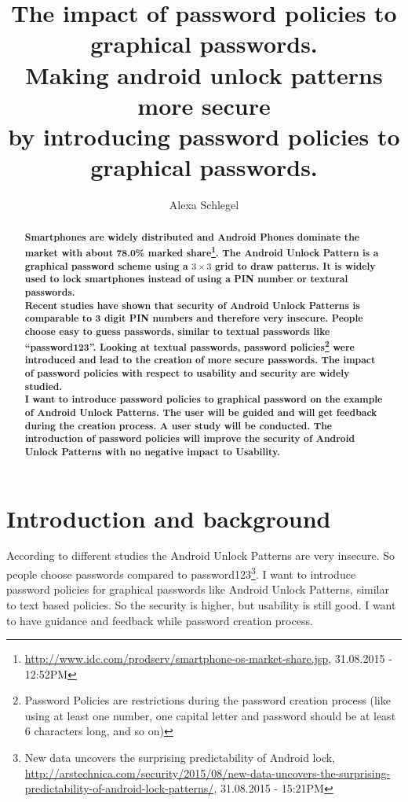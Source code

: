\documentclass[twocolumn, a4paper, 10pt]{article}
\begin{document}
\title{
  The impact of password policies to graphical passwords.\\
  \large Making android unlock patterns more secure \\
  by introducing password policies to graphical passwords.}

\author{
	Alexa Schlegel
}

\maketitle

\def\abstractname{{\textbf Abstract}}
\begin{abstract}
{
\bfseries
Smartphones are widely distributed and Android Phones dominate the market with about 78.0\% marked share\footnote{\url{http://www.idc.com/prodserv/smartphone-os-market-share.jsp}, 31.08.2015 - 12:52PM}. The Android Unlock Pattern is a graphical password scheme using a $3\times3$ grid to draw patterns. It is widely used to lock smartphones instead of using a PIN number or textural passwords.\\

Recent studies have shown that security of Android Unlock Patterns is comparable to 3 digit PIN numbers and therefore very insecure. People choose easy to guess passwords, similar to textual passwords like ``password123''. Looking at textual passwords, password policies\footnote{Password Policies are restrictions during the password creation process (like using at least one number, one capital letter and password should be at least 6 characters long, and so on)} were introduced and lead to the creation of more secure passwords. The impact of password policies with respect to usability and security are widely studied.\\

I want to introduce password policies to graphical password on the example of Android Unlock Patterns. The user will be guided and will get feedback during the creation process. A user study will be conducted. The introduction of password policies will improve the security of Android Unlock Patterns with no negative impact to Usability.
}
\end{abstract}


\section{Introduction and background}
According to different studies the Android Unlock Patterns are very insecure. So people choose passwords compared to password123\footnote{New data uncovers the surprising predictability of Android lock, \url{http://arstechnica.com/security/2015/08/new-data-uncovers-the-surprising-predictability-of-android-lock-patterns/}, 31.08.2015 - 15:21PM}. I want to introduce password policies for  graphical passwords like Android Unlock Patterns, similar to text based policies. So the security is higher, but usability is still good. I want to have guidance and feedback while password creation process.\\
\end{document}
